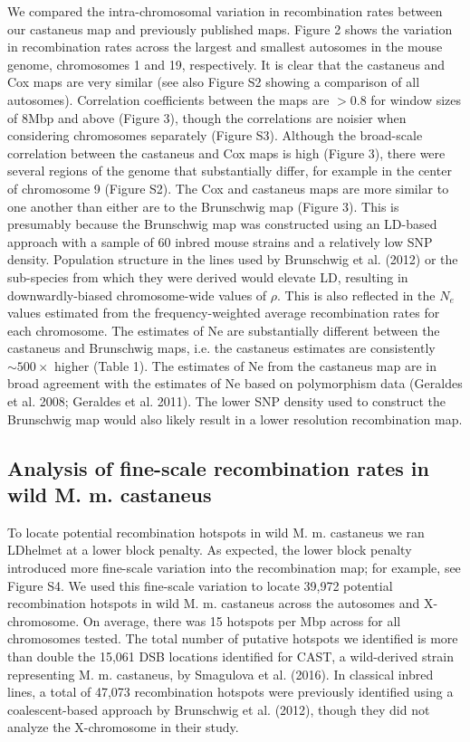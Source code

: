         	We compared the intra-chromosomal variation in recombination rates between our castaneus map and previously published maps. Figure 2 shows the variation in recombination rates across the largest and smallest autosomes in the mouse genome, chromosomes 1 and 19, respectively. It is clear that the castaneus and Cox maps are very similar (see also Figure S2 showing a comparison of all autosomes). Correlation coefficients between the maps are $>$0.8 for window sizes of 8Mbp and above (Figure 3), though the correlations are noisier when considering chromosomes separately (Figure S3). Although the broad-scale correlation between the castaneus and Cox maps is high (Figure 3), there were several regions of the genome that substantially differ, for example in the center of chromosome 9 (Figure S2). The Cox and castaneus maps are more similar to one another than either are to the Brunschwig map (Figure 3). This is presumably because the Brunschwig map was constructed using an LD-based approach with a sample of 60 inbred mouse strains and a relatively low SNP density. Population structure in the lines used by Brunschwig et al. (2012) or the sub-species from which they were derived would elevate LD, resulting in downwardly-biased chromosome-wide values of $\rho$. This is also reflected in the $N_e$ values estimated from the frequency-weighted average recombination rates for each chromosome. The estimates of Ne are substantially different between the castaneus and Brunschwig maps, i.e. the castaneus estimates are consistently $\sim500\times$ higher (Table 1). The estimates of Ne from the castaneus map are in broad agreement with the estimates of Ne based on polymorphism data (Geraldes et al. 2008; Geraldes et al. 2011). The lower SNP density used to construct the Brunschwig map would also likely result in a lower resolution recombination map.

\subsection{Analysis of fine-scale recombination rates in wild M. m. castaneus}


	To locate potential recombination hotspots in wild M. m. castaneus we ran LDhelmet at a lower block penalty. As expected, the lower block penalty introduced more fine-scale variation into the recombination map; for example, see Figure S4. We used this fine-scale variation to locate 39,972 potential recombination hotspots in wild M. m. castaneus across the autosomes and X-chromosome. On average, there was 15 hotspots per Mbp across for all chromosomes tested. The total number of putative hotspots we identified is more than double the 15,061 DSB locations identified for CAST, a wild-derived strain representing M. m. castaneus, by Smagulova et al. (2016). In classical inbred lines, a total of 47,073 recombination hotspots were previously identified using a coalescent-based approach by Brunschwig et al. (2012), though they did not analyze the X-chromosome in their study. 

